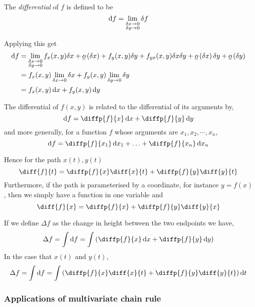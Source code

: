 \documentclass{article}
\begin{document}
\begin{defi}[Differential]
    The \emph{differential} of $f$ is defined to be
    \[
        \mathop{}\!\mathrm{d} f = \lim_{\substack{\delta x \rightarrow 0 \\ \delta y \rightarrow 0}} \delta f  
    \]
\end{defi}
Applying this get
\begin{align*}
    \mathop{}\!\mathrm{d} f &= \lim_{\substack{\delta x \rightarrow 0 \\ \delta y \rightarrow 0}} f_x(x, y)\delta x + \underline{o}\left( \delta x \right) + f_y(x, y)\delta y + f_{yx}(x, y)\delta x\delta y + \underline{o}\left( \delta x \right)\delta y + \underline{o}\left( \delta y \right) \\
    &= f_x(x, y) \lim_{\delta x \rightarrow 0} \delta x + f_y(x, y) \lim_{\delta y \rightarrow 0}\delta y \\
    &= f_x(x, y) \mathop{}\!\mathrm{d} x + f_y(x, y) \mathop{}\!\mathrm{d} y
\end{align*}

\begin{thm}
    The differential of $f(x, y)$ is related to the differential of its arguments by,
    \[
        \diffd f = \diffp{f}{x} \diffd x + \diffp{f}{y} \diffd y
    \] 
    and more generally, for a function $f$ whose arguments are $x_1, x_2, \cdots, x_n$,
    \[
        \diffd f = \diffp{f}{{x_1}} \diffd x_1 + \ldots + \diffp{f}{{x_n}} \diffd x_n
    \]
\end{thm}

Hence for the path $x(t), y(t)$
\[
    \diff{f}{t} = \diffp{f}{x} \diff{x}{t} + \diffp{f}{y} \diff{y}{t}
\]
Furthermore, if the path is parameterised by a coordinate, for instance $y = f(x)$, then we simply have a function in one variable and
\[
    \diff{f}{x} = \diffp{f}{x} + \diffp{f}{y} \diff{y}{x}
\]

\begin{defi}
    If we define $\Delta f$ as the change in height between the two endpoints we have,
    \[
        \Delta f = \int{\diffd f} = \int{\bkt{\diffp{f}{x} \diffd x + \diffp{f}{y} \diffd y}}  
    \]
    In the case that $x(t)$ and $y(t)$,
    \[
        \Delta f = \int{\diffd f} = \int{\bkt{\diffp{f}{x} \diff{x}{t} + \diffp{f}{y} \diff{y}{t}} \diffd t}  
    \]
\end{defi}
\subsubsection{Applications of multivariate chain rule}
\end{document}
